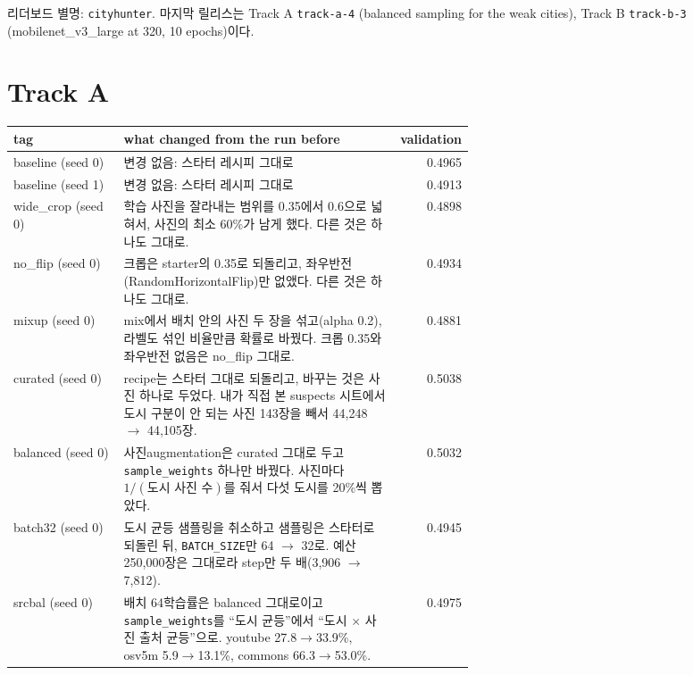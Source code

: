\documentclass[11pt]{article}
\begin{document}
\makeheader

리더보드 별명: \texttt{cityhunter}. 마지막 릴리스는 Track A \texttt{track-a-4}
(balanced sampling for the weak cities), Track B \texttt{track-b-3}
(mobilenet\_v3\_large at 320, 10 epochs)이다.


\section*{Track A}

\begin{center}\footnotesize
\begin{tabular}{lp{0.6\linewidth}r}
\toprule
tag & what changed from the run before & validation \\
\midrule
baseline (seed 0) & 변경 없음: 스타터 레시피 그대로 & 0.4965 \\
baseline (seed 1) & 변경 없음: 스타터 레시피 그대로 & 0.4913 \\
wide\_crop (seed 0) & 학습 사진을 잘라내는 범위를 0.35에서 0.6으로 넓혀서, 사진의 최소 60\%가 남게 했다. 다른 것은 하나도 그대로. & 0.4898 \\
no\_flip (seed 0) & 크롭은 starter의 0.35로 되돌리고, 좌우반전(RandomHorizontalFlip)만 없앴다. 다른 것은 하나도 그대로. & 0.4934 \\
mixup (seed 0) & mix에서 배치 안의 사진 두 장을 섞고(alpha 0.2), 라벨도 섞인 비율만큼 확률로 바꿨다. 크롭 0.35와 좌우반전 없음은 no\_flip 그대로. & 0.4881 \\
curated (seed 0) & recipe는 스타터 그대로 되돌리고, 바꾸는 것은 사진 하나로 두었다. 내가 직접 본 suspects 시트에서 도시 구분이 안 되는 사진 143장을 빼서 44,248 $\rightarrow$ 44,105장. & 0.5038 \\
balanced (seed 0) & 사진\textperiodcentered{}augmentation은 curated 그대로 두고 \texttt{sample\_weights} 하나만 바꿨다. 사진마다 $1/(\text{도시 사진 수})$를 줘서 다섯 도시를 20\%씩 뽑았다. & 0.5032 \\
batch32 (seed 0) & 도시 균등 샘플링을 취소하고 샘플링은 스타터로 되돌린 뒤, \texttt{BATCH\_SIZE}만 64 $\rightarrow$ 32로. 예산 250,000장은 그대로라 step만 두 배(3,906 $\rightarrow$ 7,812). & 0.4945 \\
srcbal (seed 0) & 배치 64\textperiodcentered{}학습률은 balanced 그대로이고 \texttt{sample\_weights}를 ``도시 균등''에서 ``도시 $\times$ 사진 출처 균등''으로. youtube 27.8$\rightarrow$33.9\%, osv5m 5.9$\rightarrow$13.1\%, commons 66.3$\rightarrow$53.0\%. & 0.4975 \\
\bottomrule
\end{tabular}
\end{center}
\end{document}
